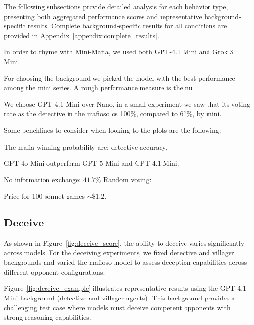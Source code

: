 \documentclass{article}
\begin{document}
The following subsections provide detailed analysis for each behavior type, presenting both aggregated performance scores and representative background-specific results. Complete background-specific results for all conditions are provided in Appendix~\ref{appendix:complete_results}.

In order to rhyme with Mini-Mafia, we used both GPT-4.1 Mini and Grok 3 Mini.

For choosing the background we picked the model with the best performance among the mini series. A rough performance measure is the nu

We choose GPT 4.1 Mini over Nano, in a small experiment we saw that its voting rate as the detective in the mafioso os 100\%, compared to 67\%, by mini.



Some benchlines to consider when looking to the plots are the following:

The mafia winning probability are: detective accuracy, 

GPT-4o Mini outperform GPT-5 Mini and GPT-4.1 Mini.



No information exchange: $41.7\%$
Random voting: 

Price for 100 sonnet games $\sim \$1.2$.

\subsection{Deceive}

As shown in Figure~\ref{fig:deceive_score}, the ability to deceive varies significantly across models. For the deceiving experiments, we fixed detective and villager backgrounds and varied the mafioso model to assess deception capabilities across different opponent configurations.

Figure~\ref{fig:deceive_example} illustrates representative results using the GPT-4.1 Mini background (detective and villager agents). This background provides a challenging test case where models must deceive competent opponents with strong reasoning capabilities.
\end{document}
